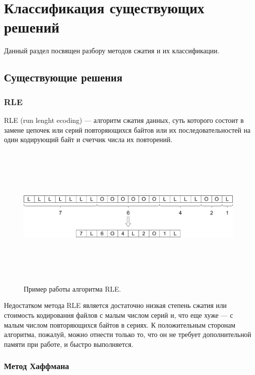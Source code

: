 \chapter{Классификация существующих решений}

	Данный раздел посвящен разбору методов сжатия и их классификации.

    \section{Существующие решения}
    
    \subsection{RLE}
    
    RLE (run lenght ecoding) --- алгоритм сжатия данных, суть которого состоит в  замене цепочек или серий
    повторяющихся байтов или их последовательностей на один кодирующий байт и счетчик числа их повторений. \cite{RLE}
    
    \begin{figure}[h!]
    	\centering
    	\includegraphics[width=\textwidth,height=7cm,keepaspectratio]{rle01.pdf}
    	\caption{Пример работы алгоритма RLE.} \label{fig:rle01}
    \end{figure}

	Недостатком метода RLE является достаточно низкая степень сжатия или
	стоимость кодирования файлов с малым числом серий и, что еще хуже --- с
	малым числом повторяющихся байтов в сериях. К положительным сторонам
	алгоритма, пожалуй, можно отнести только то, что он не требует
	дополнительной памяти при работе, и быстро выполняется.
    
    
    \subsection{Метод Хаффмана}
    
